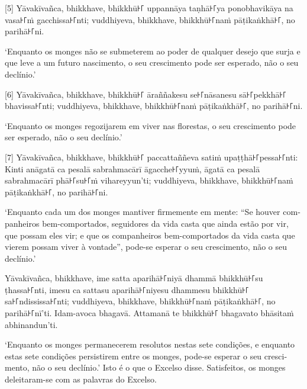 \enlargethispage{2\baselineskip}

[5] Yāvakīvañca, bhikkhave, bhikkhū꜔꜒ uppannāya taṇhā꜔꜒ya ponobhavikāya na vasa꜔꜒ṁ
gacchissa꜔꜒nti; vuddhiyeva, bhikkhave, bhikkhū꜔꜒naṁ pāṭikaṅkhā꜔꜒, no parihā꜔꜒ni.

\begin{english}
  `Enquanto os monges não se submeterem ao poder de qualquer desejo que surja e
  que leve a um futuro nascimento, o seu crescimento pode ser esperado, não o
  seu declínio.'
\end{english}

[6] Yāvakīvañca, bhikkhave, bhikkhū꜔꜒ āraññakesu se꜔꜒nāsanesu sā꜔꜒pekkhā꜔꜒ bhavissa꜔꜒nti;
vuddhiyeva, bhikkhave, bhikkhū꜔꜒naṁ pāṭikaṅkhā꜔꜒, no parihā꜔꜒ni.

\begin{english}
  `Enquanto os monges regozijarem em viver nas florestas,
  o seu crescimento pode ser esperado, não o seu declínio.'
\end{english}

[7] Yāvakīvañca, bhikkhave, bhikkhū꜔꜒ paccattaññeva satiṁ upaṭṭhā꜔꜒pessa꜔꜒nti: Kinti
anāgatā ca pesalā sabrahmacārī āgacche꜔꜒yyuṁ, āgatā ca pesalā sabrahmacārī phā꜔꜒su꜔꜒ṁ
vihareyyun'ti; vuddhiyeva, bhikkhave, bhikkhū꜔꜒naṁ pāṭikaṅkhā꜔꜒, no parihā꜔꜒ni.

\begin{english}
  `Enquanto cada um dos monges mantiver firmemente em mente: ``Se houver
  companheiros bem-comportados, seguidores da vida casta que ainda estão por
  vir, que possam eles vir; e que os companheiros bem-comportados da vida casta
  que vierem possam viver à vontade'', pode-se esperar o seu crescimento, não o
  seu declínio.'
\end{english}

Yāvakīvañca, bhikkhave, ime satta aparihā꜔꜒niyā dhammā bhikkhū꜔꜒su ṭhassa꜔꜒nti, imesu
ca sattasu aparihā꜔꜒niyesu dhammesu bhikkhū꜔꜒ sa꜔꜒ndississa꜔꜒nti; vuddhiyeva, bhikkhave,
bhikkhū꜔꜒naṁ pāṭikaṅkhā꜔꜒, no parihā꜔꜒nī'ti. Idam-avoca bhagavā. Attamanā te bhikkhū꜔꜒
bhagavato bhāsitaṁ abhinandun'ti.

\begin{english}
  `Enquanto os monges permanecerem resolutos nestas sete condições, e enquanto
  estas sete condições persistirem entre os monges, pode-se esperar o seu
  crescimento, não o seu declínio.' Isto é o que o Excelso disse. Satisfeitos,
  os monges deleitaram-se com as palavras do Excelso.
\end{english}
